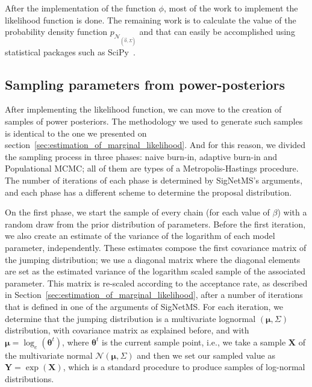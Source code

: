 After the implementation of the function $\phi$, most of the work to
implement the likelihood function is done. The remaining work is to
calculate the value of the probability density function
$p_{\mathcal{N}_{\left(\vec{0}, \Sigma\right)}}$ and that can easily be
accomplished using statistical packages such as
SciPy~\cite{2020SciPy-NMeth}.

\subsection{Sampling parameters from power-posteriors}

After implementing the likelihood function, we can move to the creation
of samples of power posteriors. The methodology we used to generate such
samples is identical to the one we presented on
section~\ref{sec:estimation_of_marginal_likelihood}. And for this
reason, we divided the sampling process in three phases: naive burn-in,
adaptive burn-in and Populational MCMC; all of them are types of a 
Metropolis-Hastings procedure. The number of iterations of each phase is
determined by SigNetMS's arguments, and each phase has a different 
scheme to determine the proposal distribution.

On the first phase, we start the sample of every chain (for each value
of $\beta$) with a random draw from the prior distribution of
parameters. Before the first iteration, we also create an estimate of
the variance of the logarithm of each model parameter, independently.
These estimates compose the first covariance matrix of the jumping 
distribution; we use a diagonal matrix where the diagonal elements are
set as the estimated variance of the logarithm scaled sample of the
associated parameter. This matrix is re-scaled according to the
acceptance rate, as described in
Section~\ref{sec:estimation_of_marginal_likelihood}, after a number of
iterations that is defined in one of the arguments of SigNetMS. For each
iteration, we determine that the jumping distribution is a multivariate
lognormal $({\bm \mu}, \Sigma)$ distribution, with covariance matrix as
explained before, and with ${\bm \mu} = \log_e({\bm \theta}^t)$, where
${\bm \theta}^t$ is the current sample point, i.e., we take a
sample ${\bm X}$ of the multivariate normal $\mathcal{N}({\bm \mu},
\Sigma)$ and then we set our sampled value  as ${\bm Y} = \exp({\bm
X})$, which is a standard procedure to produce samples of log-normal
distributions.

